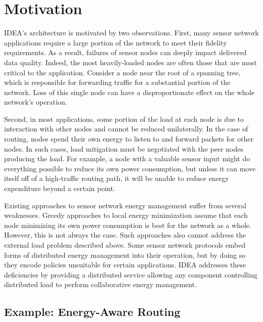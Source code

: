 \section{Motivation}
\label{sec-motivation}

IDEA's architecture is motivated by two observations. First, many sensor
network applications require a large portion of the network to meet their
fidelity requirements. As a result, failures of sensor nodes can deeply
impact delivered data quality. Indeed, the most heavily-loaded nodes are
often those that are most critical to the application. Consider a node near
the root of a spanning tree, which is responsible for forwarding traffic for
a substantial portion of the network. Loss of this single node can have a
disproportionate effect on the whole network's operation.
\vfill\eject

Second, in most applications, some portion of the load at each node is due to
interaction with other nodes and cannot be reduced unilaterally. In the case
of routing, nodes spend their own energy to listen to and forward packets for
other nodes. In such cases, load mitigation must be negotiated with the peer
nodes producing the load. For example, a node with a valuable sensor input
might do everything possible to reduce its own power consumption, but unless
it can move itself off of a high-traffic routing path, it will be unable to
reduce energy expenditure beyond a certain point.

Existing approaches to sensor network energy management suffer from several
weaknesses. Greedy approaches to local energy minimization assume that each
node minimizing its own power consumption is best for the network as a whole.
However, this is not always the case. Such approaches also cannot address the
external load problem described above. Some sensor network protocols embed
forms of distributed energy management into their operation, but by doing so
they encode policies unsuitable for certain applications. IDEA addresses
these deficiencies by providing a distributed service allowing any component
controlling distributed load to perform collaborative energy management.

\subsection{Example: Energy-Aware Routing}


